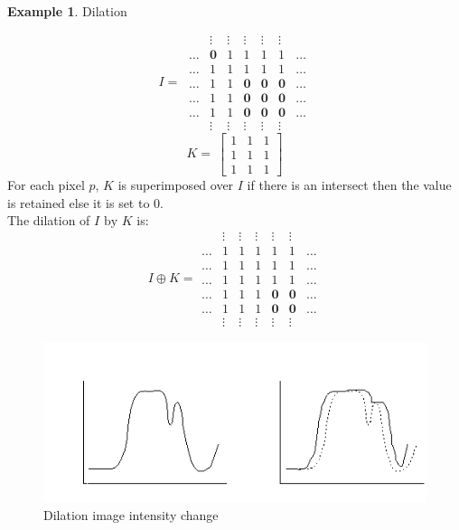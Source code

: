\documentclass{article}
\theoremstyle{definition}
\newtheorem{ex}{Example}[subsection]
\theoremstyle{remark}
\begin{document}
\begin{ex} Dilation

\begin{equation*}
    I =\  \begin{matrix}
	& \vdots  & \vdots & \vdots  & \vdots & \vdots \\
	\dots & \pmb{0}  & 1 & 1 & 1 & 1 & \dots \\
	\dots & 1 & 1 & 1 & 1 & 1 & \dots \\
	\dots & 1 & 1 & \pmb{0} & \pmb{0} & \pmb{0} & \dots \\
	\dots & 1 & 1 & \pmb{0} & \pmb{0} &\pmb{0}  & \dots \\
	\dots & 1 & 1 & \pmb{0} & \pmb{0} & \pmb{0} & \dots \\
	& \vdots  & \vdots & \vdots  & \vdots & \vdots 
    \end{matrix}
\end{equation*}
\begin{equation*}
    K =\ \begin{bmatrix}
	1 & 1 & 1 \\
	1 & 1 & 1 \\
	1 & 1 & 1  
    \end{bmatrix}
\end{equation*}
For each pixel $ p $, $ K $ is superimposed over $ I $ if there is an intersect then the value is retained else it is set to $ 0 $.\\

\noindent The dilation of $ I \text{ by } K $ is:
\begin{equation*}
    I \oplus K = \begin{matrix}
	& \vdots  & \vdots & \vdots  & \vdots & \vdots \\
	\dots & 1 & 1 & 1 & 1 & 1 & \dots \\
	\dots & 1 & 1 & 1 & 1 & 1 & \dots \\
	\dots & 1 & 1 & 1 & 1 & 1 & \dots \\
	\dots & 1 & 1 & 1 & \pmb{0} & \pmb{0} & \dots \\
	\dots & 1 & 1 & 1 & \pmb{0} & \pmb{0} & \dots \\
	& \vdots  & \vdots & \vdots  & \vdots & \vdots 
    \end{matrix}
\end{equation*}
\end{ex}

\begin{figure}[H]
    \centering
    \includegraphics[width=\textwidth]{dilation}
    \caption{Dilation image intensity change}
    \label{fig:dialtion}
\end{figure}
\end{document}
